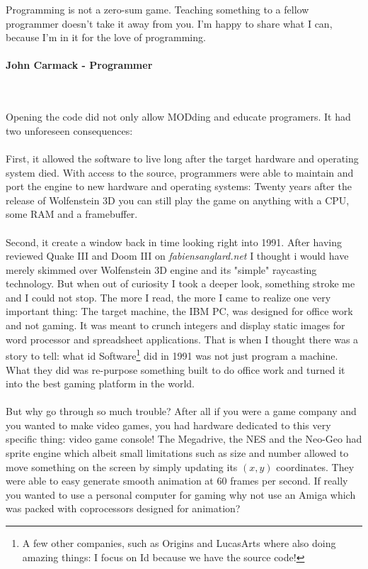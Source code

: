  \begin{fancyquotes}
   Programming is not a zero-sum game. Teaching something to a fellow programmer doesn't take it away from you. I'm happy to share what I can, because I'm in it for the love of programming.\\
   \\
\textbf{John Carmack - Programmer}
 \end{fancyquotes}\\
\\
Opening the code did not only allow MODding and educate programers. It had two unforeseen consequences:\\
\\
First, it allowed the software to live long after the target hardware and operating system died. With access to the source, programmers were able to maintain and port the engine to new hardware and operating systems: Twenty years after the release of Wolfenstein 3D you can still play the game on anything with a CPU, some RAM and a framebuffer. \\
\\
Second, it create a window back in time looking right into 1991. After having reviewed Quake III and Doom III on \emph{fabiensanglard.net} I thought i would have merely skimmed over Wolfenstein 3D engine and its "simple" raycasting technology. But when out of curiosity I took a deeper look, something stroke me and I could not stop. The more I read, the more I came to realize one very important thing: The target machine, the IBM PC, was designed for office work and not gaming. It was meant to crunch integers and display static images for word processor and spreadsheet applications. That is when I thought there was a story to tell: what id Software\footnote{A few other companies, such as Origins and LucasArts where also doing amazing things: I focus on Id because we have the source code!} did in 1991 was not just program a machine. What they did was re-purpose something built to do office work and turned it into the best gaming platform in the world.\\
\\
But why go through so much trouble? After all if you were a game company and you wanted to make video games, you had hardware dedicated to this very specific thing: video game console! The Megadrive, the NES and the Neo-Geo had sprite engine which albeit small limitations such as size and number allowed to move something on the screen by simply updating its $(x,y)$ coordinates. They were able to easy generate smooth animation at 60 frames per second. If really you wanted to use a personal computer for gaming why not use an Amiga which was packed with coprocessors designed for animation?\\
